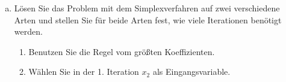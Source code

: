 \documentclass[11pt, a4paper]{article}
\begin{document}
\begin{enumerate}[\bfseries A:]
\begin{enumerate}[\bfseries 1.]
\begin{enumerate}[a)]
	\item Lösen Sie das Problem mit dem Simplexverfahren auf zwei verschiedene Arten und stellen Sie für beide Arten fest, wie viele Iterationen benötigt werden.
	\begin{enumerate}[ (i)]
		\item Benutzen Sie die Regel vom größten Koeffizienten.
		\item Wählen Sie in der 1. Iteration $x_2$ als Eingangsvariable.
	\end{enumerate}
\end{enumerate}


\end{enumerate}
\end{enumerate}
\end{document}
